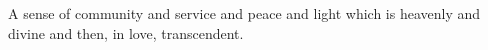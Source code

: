 

A sense of community and service and peace and light which is heavenly
and divine and then, in love, transcendent.

\bye
